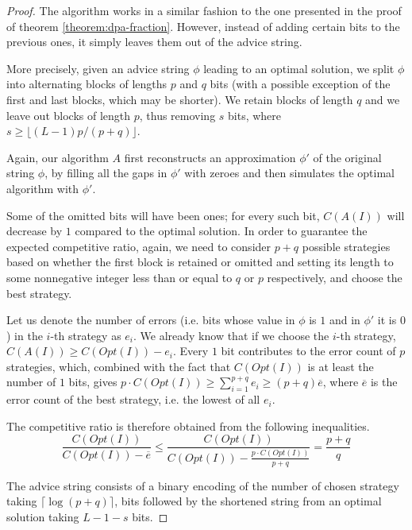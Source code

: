 \begin{proof}
    The algorithm works in a similar fashion to the one presented in the
    proof of theorem \ref{theorem:dpa-fraction}. However, instead of
    adding certain bits to the previous ones, it simply leaves them out of
    the advice string.

    More precisely, given an advice string $\phi$ leading to an optimal
    solution, we split $\phi$ into alternating blocks of lengths $p$ and
    $q$ bits (with a possible exception of the first and last blocks,
    which may be shorter). We retain blocks of length $q$ and we leave out
    blocks of length $p$, thus removing $s$ bits, where $s \geq
    \lfloor(L-1) p / (p+q)\rfloor$.

    Again, our algorithm $A$ first reconstructs an approximation
    $\phi'$ of the original string $\phi$, by filling all the gaps in
    $\phi'$ with zeroes and then simulates the optimal algorithm with
    $\phi'$.

    Some of the omitted bits will have been ones; for every such bit,
    $C(A(I))$ will decrease by $1$ compared to the optimal solution. In
    order to guarantee the expected competitive ratio, again, we need to
    consider $p+q$ possible strategies based on whether the first block is
    retained or omitted and setting its length to some nonnegative integer
    less than or equal to $q$ or $p$ respectively, and choose the best
    strategy.

    Let us denote the number of errors (i.e. bits whose value in $\phi$ is
    $1$ and in $\phi'$ it is $0$) in the $i$-th strategy as $e_i$. We
    already know that if we choose the $i$-th strategy, $C(A(I)) \geq
    C(Opt(I)) - e_i$. Every $1$ bit contributes to the error count of $p$
    strategies, which, combined with the fact that $C(Opt(I))$ is at least
    the number of $1$ bits, gives $p \cdot C(Opt(I)) \geq \sum_{i=1}^{p+q}
    e_i \geq (p+q) \overline{e}$, where $\overline{e}$ is the error count
    of the best strategy, i.e. the lowest of all $e_i$.

    The competitive ratio is therefore obtained from the following
    inequalities.
    $$
        \frac{C(Opt(I))}{C(Opt(I))-\overline{e}} \leq
        \frac{C(Opt(I))}{C(Opt(I)) - \frac{p\cdot{}C(Opt(I))}{p+q}} =
        \frac{p+q}{q}
    $$

    The advice string consists of a binary encoding of the number of
    chosen strategy taking $\lceil\log(p+q)\rceil$, bits followed by the
    shortened string from an optimal solution taking $L - 1 - s$ bits.
\end{proof}

